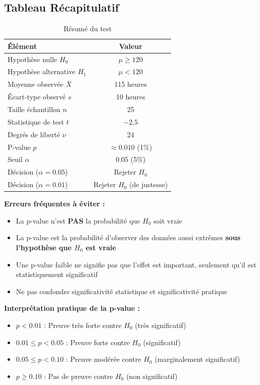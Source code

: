 \documentclass[11pt,a4paper]{article}
\begin{document}
\subsection{Tableau Récapitulatif}

\begin{table}[h]
\centering
\small
\begin{tabular}{|l|c|}
\hline
\textbf{Élément} & \textbf{Valeur} \\
\hline
Hypothèse nulle $H_0$ & $\mu \geq 120$ \\
\hline
Hypothèse alternative $H_1$ & $\mu < 120$ \\
\hline
Moyenne observée $\overline{X}$ & 115 heures \\
\hline
Écart-type observé $s$ & 10 heures \\
\hline
Taille échantillon $n$ & 25 \\
\hline
Statistique de test $t$ & $-2.5$ \\
\hline
Degrés de liberté $\nu$ & 24 \\
\hline
P-value $p$ & $\approx 0.010$ (1\%) \\
\hline
Seuil $\alpha$ & 0.05 (5\%) \\
\hline
Décision ($\alpha = 0.05$) & Rejeter $H_0$ \\
\hline
Décision ($\alpha = 0.01$) & Rejeter $H_0$ (de justesse) \\
\hline
\end{tabular}
\caption{Résumé du test}
\end{table}

\begin{attentionbox}
\textbf{Erreurs fréquentes à éviter :}
\begin{itemize}
    \item La p-value n'est \textbf{PAS} la probabilité que $H_0$ soit vraie
    \item La p-value est la probabilité d'observer des données aussi extrêmes \textbf{sous l'hypothèse que $H_0$ est vraie}
    \item Une p-value faible ne signifie pas que l'effet est important, seulement qu'il est statistiquement significatif
    \item Ne pas confondre significativité statistique et significativité pratique
\end{itemize}
\end{attentionbox}

\begin{astucebox}
\textbf{Interprétation pratique de la p-value :}
\begin{itemize}
    \item $p < 0.01$ : Preuve très forte contre $H_0$ (très significatif)
    \item $0.01 \leq p < 0.05$ : Preuve forte contre $H_0$ (significatif)
    \item $0.05 \leq p < 0.10$ : Preuve modérée contre $H_0$ (marginalement significatif)
    \item $p \geq 0.10$ : Pas de preuve contre $H_0$ (non significatif)
\end{itemize}
\end{astucebox}
\end{document}
